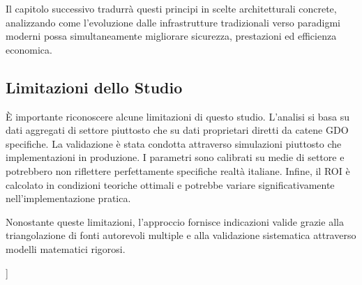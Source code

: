 Il capitolo successivo tradurrà questi principi in scelte architetturali concrete, analizzando come l'evoluzione dalle infrastrutture tradizionali verso paradigmi moderni possa simultaneamente migliorare sicurezza, prestazioni ed efficienza economica.

\subsection*{Limitazioni dello Studio}

È importante riconoscere alcune limitazioni di questo studio. L'analisi si basa su dati aggregati di settore piuttosto che su dati proprietari diretti da catene GDO specifiche. La validazione è stata condotta attraverso simulazioni piuttosto che implementazioni in produzione. I parametri sono calibrati su medie di settore e potrebbero non riflettere perfettamente specifiche realtà italiane. Infine, il ROI è calcolato in condizioni teoriche ottimali e potrebbe variare significativamente nell'implementazione pratica.

Nonostante queste limitazioni, l'approccio fornisce indicazioni valide grazie alla triangolazione di fonti autorevoli multiple e alla validazione sistematica attraverso modelli matematici rigorosi.

\clearpage
\printbibliography[
    heading=subbibliography,
    title={Riferimenti Bibliografici del Capitolo 2},
    segment=\therefsegment
]
]